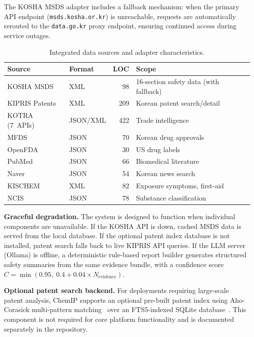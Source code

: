 \documentclass[preprint,12pt]{elsarticle}
\begin{document}
The KOSHA MSDS adapter includes a fallback mechanism: when the primary API endpoint (\texttt{msds.kosha.or.kr}) is unreachable, requests are automatically rerouted to the \texttt{data.go.kr} proxy endpoint, ensuring continued access during service outages.

\begin{table}[H]
\centering
\caption{Integrated data sources and adapter characteristics.}
\label{tab:sources}
\small
\begin{tabular}{@{}llrl@{}}
\toprule
\textbf{Source} & \textbf{Format} & \textbf{LOC} & \textbf{Scope} \\
\midrule
KOSHA MSDS & XML & 98 & 16-section safety data (with fallback) \\
KIPRIS Patents & XML & 209 & Korean patent search/detail \\
KOTRA (7~APIs) & JSON/XML & 422 & Trade intelligence \\
MFDS & JSON & 70 & Korean drug approvals \\
OpenFDA & JSON & 30 & US drug labels \\
PubMed & JSON & 66 & Biomedical literature \\
Naver & JSON & 54 & Korean news search \\
KISCHEM & XML & 82 & Exposure symptoms, first-aid \\
NCIS & JSON & 78 & Substance classification \\
\bottomrule
\end{tabular}
\end{table}

\textbf{Graceful degradation.}
The system is designed to function when individual components are unavailable.
If the KOSHA API is down, cached MSDS data is served from the local database.
If the optional patent index database is not installed, patent search falls back to live KIPRIS API queries.
If the LLM server (Ollama) is offline, a deterministic rule-based report builder generates structured safety summaries from the same evidence bundle, with a confidence score $C = \min(0.95,\; 0.4 + 0.04 \times N_{\text{evidence}})$.

\textbf{Optional patent search backend.}
For deployments requiring large-scale patent analysis, ChemIP supports an optional pre-built patent index using Aho-Corasick multi-pattern matching~\cite{ahocorasick} over an FTS5-indexed SQLite database~\cite{sqlite_fts5}.
This component is not required for core platform functionality and is documented separately in the repository.
\end{document}
